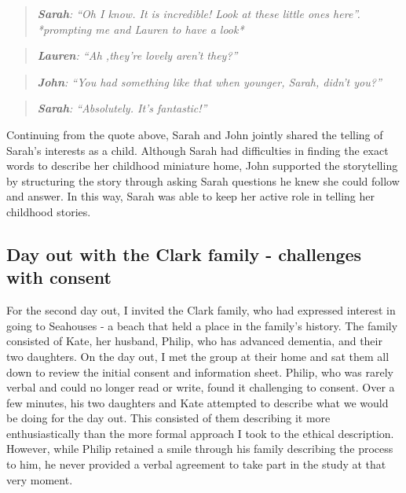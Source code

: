 \begin{quote}
\textit{    \textbf{Sarah}: ``Oh I know. It is incredible! Look at these little ones here''. *prompting me and Lauren to have a look*}

\end{quote}

\begin{quote}
\textit{    \textbf{Lauren}: ``Ah ,they're lovely aren't they?''
}
\end{quote}

\begin{quote}
\textit{    \textbf{John}: ``You had something like that when younger, Sarah, didn't you?''
}
\end{quote}

\begin{quote}
\textit{    \textbf{Sarah}: ``Absolutely. It's fantastic!''
}
\end{quote}

Continuing from the quote above, Sarah and John jointly shared the telling of Sarah's interests as a child. Although Sarah had difficulties in finding the exact words to describe her childhood miniature home, John supported the storytelling by structuring the story through asking Sarah questions he knew she could follow and answer. In this way, Sarah was able to keep her active role in telling her childhood stories.


\subsection{Day out with the Clark family - challenges with consent}
\label{ClarkFamily}
For the second day out, I invited the Clark family, who had expressed interest in going to Seahouses - a beach that held a place in the family's history. The family consisted of Kate, her husband, Philip, who has advanced dementia, and their two daughters. On the day out, I met the group at their home and sat them all down to review the initial consent and information sheet. Philip, who was rarely verbal and could no longer read or write, found it challenging to consent. Over a few minutes, his two daughters and Kate attempted to describe what we would be doing for the day out. This consisted of them describing it more enthusiastically than the more formal approach I took to the ethical description. However, while Philip retained a smile through his family describing the process to him, he never provided a verbal agreement to take part in the study at that very moment.

